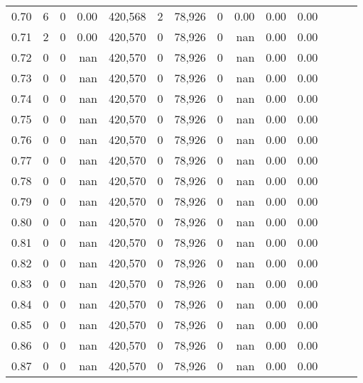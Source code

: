 \begin{tabular}{rrrrrrrrrrrrrr}
0.70 &       6 &      0 &  0.00 &  420,568 &        2 &  78,926 &       0 &  0.00 &  0.00 &      0.00 \\
0.71 &       2 &      0 &  0.00 &  420,570 &        0 &  78,926 &       0 &   nan &  0.00 &      0.00 \\
0.72 &       0 &      0 &   nan &  420,570 &        0 &  78,926 &       0 &   nan &  0.00 &      0.00 \\
0.73 &       0 &      0 &   nan &  420,570 &        0 &  78,926 &       0 &   nan &  0.00 &      0.00 \\
0.74 &       0 &      0 &   nan &  420,570 &        0 &  78,926 &       0 &   nan &  0.00 &      0.00 \\
0.75 &       0 &      0 &   nan &  420,570 &        0 &  78,926 &       0 &   nan &  0.00 &      0.00 \\
0.76 &       0 &      0 &   nan &  420,570 &        0 &  78,926 &       0 &   nan &  0.00 &      0.00 \\
0.77 &       0 &      0 &   nan &  420,570 &        0 &  78,926 &       0 &   nan &  0.00 &      0.00 \\
0.78 &       0 &      0 &   nan &  420,570 &        0 &  78,926 &       0 &   nan &  0.00 &      0.00 \\
0.79 &       0 &      0 &   nan &  420,570 &        0 &  78,926 &       0 &   nan &  0.00 &      0.00 \\
0.80 &       0 &      0 &   nan &  420,570 &        0 &  78,926 &       0 &   nan &  0.00 &      0.00 \\
0.81 &       0 &      0 &   nan &  420,570 &        0 &  78,926 &       0 &   nan &  0.00 &      0.00 \\
0.82 &       0 &      0 &   nan &  420,570 &        0 &  78,926 &       0 &   nan &  0.00 &      0.00 \\
0.83 &       0 &      0 &   nan &  420,570 &        0 &  78,926 &       0 &   nan &  0.00 &      0.00 \\
0.84 &       0 &      0 &   nan &  420,570 &        0 &  78,926 &       0 &   nan &  0.00 &      0.00 \\
0.85 &       0 &      0 &   nan &  420,570 &        0 &  78,926 &       0 &   nan &  0.00 &      0.00 \\
0.86 &       0 &      0 &   nan &  420,570 &        0 &  78,926 &       0 &   nan &  0.00 &      0.00 \\
0.87 &       0 &      0 &   nan &  420,570 &        0 &  78,926 &       0 &   nan &  0.00 &      0.00 \\

\end{tabular}
